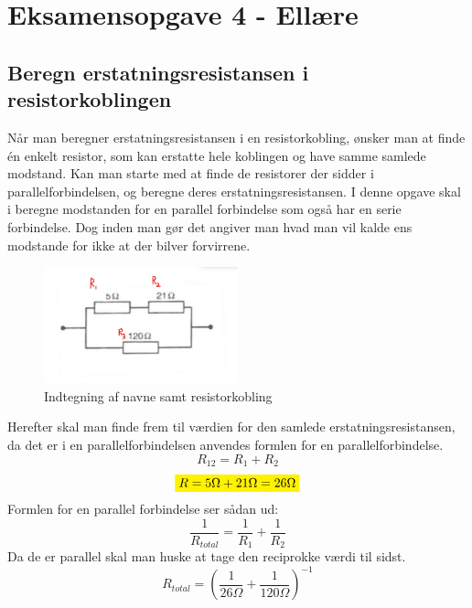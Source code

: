 \newpage
\section{Eksamensopgave 4 - Ellære}
\subsection{Beregn erstatningsresistansen i resistorkoblingen}
Når man beregner erstatningsresistansen i en resistorkobling, ønsker man at finde én enkelt resistor, som kan erstatte hele koblingen og have samme samlede modstand. Kan man starte med at finde de resistorer der sidder i parallelforbindelsen, og beregne deres erstatningsresistansen. 
I denne opgave skal i beregne modstanden for en parallel forbindelse som også har en serie forbindelse. Dog inden man gør det angiver man hvad man vil kalde ens modstande for ikke at der bilver forvirrene.
\begin{figure}[h!]
    \centering
    \includegraphics[width=0.5\textwidth]{figures/resistans.png}
    \caption{Indtegning af navne samt resistorkobling}
\end{figure}
Herefter skal man finde frem til værdien for den samlede erstatningsresistansen, da det er i en parallelforbindelsen anvendes formlen for en parallelforbindelse.
\begin{equation*} %
    R_{12}=R_{1}+R_{2}
\end{equation*}
\begin{equation*}
    \mathcolorbox{yellow}{R=5\Omega+21\Omega=26\Omega}
\end{equation*}
Formlen for en parallel forbindelse ser sådan ud:
\begin{equation*}
    \frac{1}{R_{total}}=\frac{1}{R_{1}}+\frac{1}{R_{2}}
\end{equation*}
Da de er parallel skal man huske at tage den reciprokke værdi til sidst.
\begin{equation*}
    R_{total}=\left(\frac{1}{26\Omega}+\frac{1}{120\Omega}\right)^{-1}
\end{equation*}

